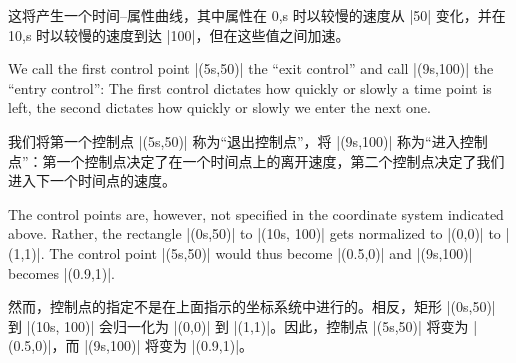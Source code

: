 这将产生一个时间--属性曲线，其中属性在 0,s 时以较慢的速度从 |50| 变化，并在 10,s 时以较慢的速度到达 |100|，但在这些值之间加速。

We call the first control point |(5s,50)| the ``exit control'' and call
|(9s,100)| the ``entry control'': The first control dictates how quickly or
slowly a time point is left, the second dictates how quickly or slowly we enter
the next one.

我们将第一个控制点 |(5s,50)| 称为“退出控制点”，将 |(9s,100)| 称为“进入控制点”：第一个控制点决定了在一个时间点上的离开速度，第二个控制点决定了我们进入下一个时间点的速度。

The control points are, however, not specified in the coordinate system
indicated above. Rather, the rectangle |(0s,50)| to |(10s, 100)| gets
normalized to |(0,0)| to |(1,1)|. The control point |(5s,50)| would thus become
|(0.5,0)| and |(9s,100)| becomes |(0.9,1)|.

然而，控制点的指定不是在上面指示的坐标系统中进行的。相反，矩形 |(0s,50)| 到 |(10s, 100)| 会归一化为 |(0,0)| 到 |(1,1)|。因此，控制点 |(5s,50)| 将变为 |(0.5,0)|，而 |(9s,100)| 将变为 |(0.9,1)|。

